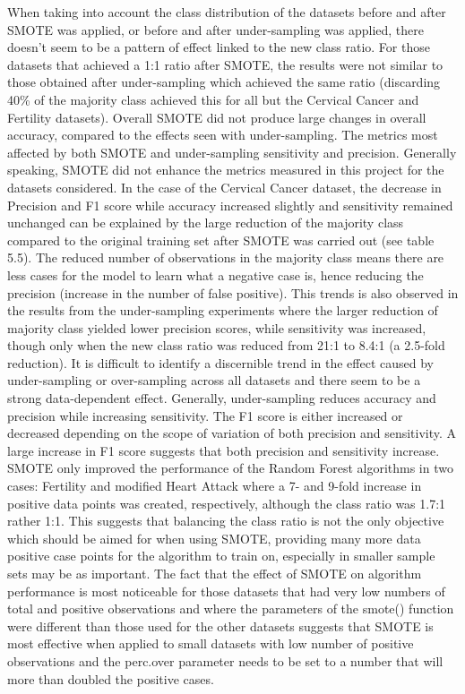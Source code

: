 When taking into account the class distribution of the datasets before and after SMOTE was applied, or before and after under-sampling was applied, there doesn't seem to be a pattern of effect linked to the new class ratio. For those datasets that achieved a 1:1 ratio after SMOTE, the results were not similar to those obtained after under-sampling which achieved the same ratio (discarding 40\% of the majority class achieved this for all but the Cervical Cancer and Fertility datasets). \newline 
Overall SMOTE did not produce large changes in overall accuracy, compared to the effects seen with under-sampling. The metrics most affected by both SMOTE and under-sampling sensitivity and precision. Generally speaking, SMOTE did not enhance the metrics measured in this project for the datasets considered.\newline
In the case of the Cervical Cancer dataset, the decrease in Precision and F1 score while accuracy increased slightly and sensitivity remained unchanged can be explained by the large reduction of the majority class compared to the original training set after SMOTE was carried out (see table 5.5). The reduced number of observations in the majority class means there are less cases for the model to learn what a negative case is, hence reducing the precision (increase in the number of false positive). This trends is also observed in the results from the under-sampling experiments where the larger reduction of majority class yielded lower precision scores, while sensitivity was increased, though only when the new class ratio was reduced from 21:1 to 8.4:1 (a 2.5-fold reduction).\newline
It is difficult to identify a discernible trend in the effect caused by under-sampling or over-sampling across all datasets and there seem to be a strong data-dependent effect. Generally, under-sampling reduces accuracy and precision while increasing sensitivity. The F1 score is either increased or decreased depending on the scope of variation of both precision and sensitivity. A large increase in F1 score suggests that both precision and sensitivity increase.\newline
SMOTE only improved the performance of the Random Forest algorithms in two cases: Fertility and modified Heart Attack where a 7- and 9-fold increase in positive data points was created, respectively, although the class ratio was 1.7:1 rather 1:1. This suggests that balancing the class ratio is not the only objective which should be aimed for when using SMOTE, providing many more data positive case points for the algorithm to train on, especially in smaller sample sets may be as important. The fact that the effect of SMOTE on algorithm performance is most noticeable for those datasets that had very low numbers of total and positive observations and where the parameters of the smote() function were different than those used for the other datasets suggests that SMOTE is most effective when applied to small datasets with low number of positive observations and the perc.over parameter needs to be set to a number that will more than doubled the positive cases.\newline
